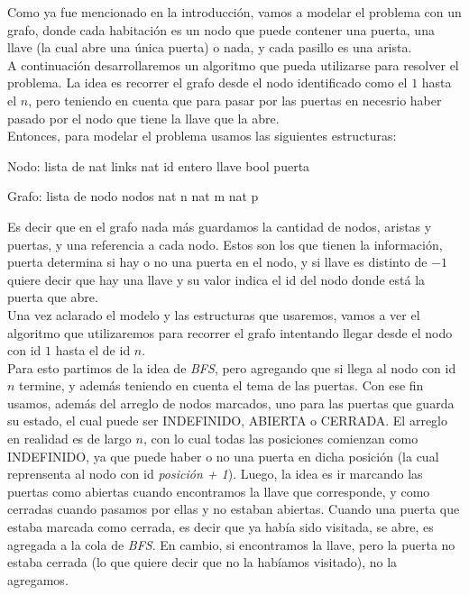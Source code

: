 
Como ya fue mencionado en la introducción, vamos a modelar el problema con un grafo, donde cada habitación es un nodo que puede contener una puerta, una llave (la cual abre una única puerta) o nada, y cada pasillo es una arista. \\

A continuación desarrollaremos un algoritmo que pueda utilizarse para resolver el problema. La idea es recorrer el grafo desde el nodo identificado como el $1$ hasta el $n$, pero teniendo en cuenta que para pasar por las puertas en necesrio haber pasado por el nodo que tiene la llave que la abre. \\

Entonces, para modelar el problema usamos las siguientes estructuras:

\begin{verbatimtab}
Nodo:
	lista de nat links
	nat id
	entero llave
	bool puerta
\end{verbatimtab}

\begin{verbatimtab}
Grafo:
	lista de nodo nodos
	nat n
	nat m
	nat p
\end{verbatimtab}

Es decir que en el grafo nada más guardamos la cantidad de nodos, aristas y puertas, y una referencia a cada nodo. Estos son los que tienen la información, puerta determina si hay o no una puerta en el nodo, y si llave es distinto de $-1$ quiere decir que hay una llave y su valor indica el id del nodo donde está la puerta que abre. \\

Una vez aclarado el modelo y las estructuras que usaremos, vamos a ver el algoritmo que utilizaremos para recorrer el grafo intentando llegar desde el nodo con id $1$ hasta el de id $n$. \\

Para esto partimos de la idea de \textit{BFS}, pero agregando que si llega al nodo con id $n$ termine, y además teniendo en cuenta el tema de las puertas. Con ese fin usamos, además del arreglo de nodos marcados, uno para las puertas que guarda su estado, el cual puede ser INDEFINIDO, ABIERTA o CERRADA. El arreglo en realidad es de largo $n$, con lo cual todas las posiciones comienzan como INDEFINIDO, ya que puede haber o no una puerta en dicha posición (la cual reprensenta al nodo con id \textit{posición + 1}). Luego, la idea es ir marcando las puertas como abiertas cuando encontramos la llave que corresponde, y como cerradas cuando pasamos por ellas y no estaban abiertas. Cuando una puerta que estaba marcada como cerrada, es decir que ya había sido visitada, se abre, es agregada a la cola de \textit{BFS}. En cambio, si encontramos la llave, pero la puerta no estaba cerrada (lo que quiere decir que no la habíamos visitado), no la agregamos. \\

